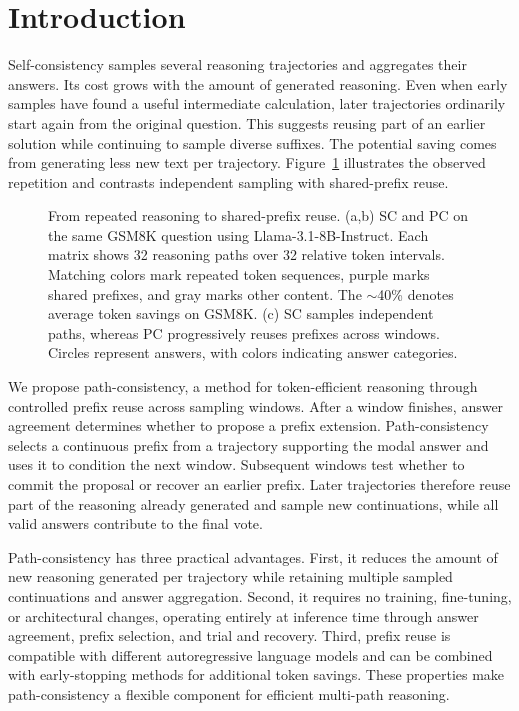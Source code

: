 \section{Introduction}
Self-consistency samples several reasoning trajectories and aggregates their answers.
Its cost grows with the amount of generated reasoning. Even when early samples have found a useful intermediate calculation, later trajectories ordinarily start again from the original question. This suggests reusing part of an earlier solution while continuing to sample diverse suffixes. The potential saving comes from generating less new text per trajectory. Figure~\ref{fig:overview} illustrates the observed repetition and contrasts independent sampling with shared-prefix reuse.

\begin{figure}[t]
\centering

\caption{From repeated reasoning to shared-prefix reuse. (a,b) SC and PC on the same GSM8K question using Llama-3.1-8B-Instruct. Each matrix shows 32 reasoning paths over 32 relative token intervals. Matching colors mark repeated token sequences, purple marks shared prefixes, and gray marks other content. The $\sim$40\% denotes average token savings on GSM8K. (c) SC samples independent paths, whereas PC progressively reuses prefixes across windows. Circles represent answers, with colors indicating answer categories.}
\label{fig:overview}
\end{figure}

We propose path-consistency, a method for token-efficient reasoning through controlled prefix reuse across sampling windows. After a window finishes, answer agreement determines whether to propose a prefix extension. Path-consistency selects a continuous prefix from a trajectory supporting the modal answer and uses it to condition the next window. Subsequent windows test whether to commit the proposal or recover an earlier prefix. Later trajectories therefore reuse part of the reasoning already generated and sample new continuations, while all valid answers contribute to the final vote.

Path-consistency has three practical advantages. First, it reduces the amount of new reasoning generated per trajectory while retaining multiple sampled continuations and answer aggregation. Second, it requires no training, fine-tuning, or architectural changes, operating entirely at inference time through answer agreement, prefix selection, and trial and recovery. Third, prefix reuse is compatible with different autoregressive language models and can be combined with early-stopping methods for additional token savings. These properties make path-consistency a flexible component for efficient multi-path reasoning.

